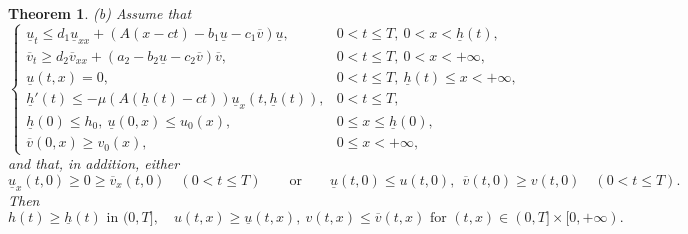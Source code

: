\documentclass[reqno]{amsart}
\theoremstyle{plain}
\newtheorem{theorem}{Theorem}
\theoremstyle{definition}
\theoremstyle{remark}
\begin{document}
\begin{theorem}
	\emph{(b)} Assume that
	\[
	\begin{cases}
		\underline{u}_t \le d_1\underline{u}_{xx} + (A(x - ct) - b_1\underline{u} - c_1 \overline{v}) \underline{u}, & 0 < t \le T,~ 0 < x < \underline{h}(t), \\
		\overline{v}_t \ge d_2\overline{v}_{xx} + (a_2 - b_2\underline{u} - c_2\overline{v})\overline{v}, & 0 < t \le T,~ 0 < x < +\infty, \\
		\underline{u}(t, x) = 0, & 0 < t \le T, ~ \underline{h}(t) \leq x < +\infty, \\
		\underline{h}'(t) \le -\mu (A(\underline{h}(t) - ct))\underline{u}_x(t, \underline{h}(t)), & 0 < t \le T, \\
		\underline{h}(0) \le h_0,~ \underline{u}(0, x) \le u_0(x), & 0 \leq x \leq \underline h(0), \\
		\overline{v}(0, x) \ge v_0(x), & 0 \le x < +\infty,
	\end{cases}
	\]
	and that, in addition, either
	\[
	\underline{u}_x(t, 0) \ge 0 \ge \overline{v}_x(t, 0)\quad (0<t\le T)
	\qquad\text{or}\qquad
	\underline{u}(t,0)\le u(t,0),\ \ \overline v(t,0)\ge v(t,0)\quad (0<t\le T).
	\]
	Then
	\[
	h(t) \ge \underline{h}(t) \text{ in } (0,T],\quad u(t,x) \ge \underline{u} (t,x), ~ v(t,x) \le \overline{v} (t,x) \text{ for } (t,x) \in (0,T] \times [0,+\infty).
	\]
\end{theorem}
\end{document}
